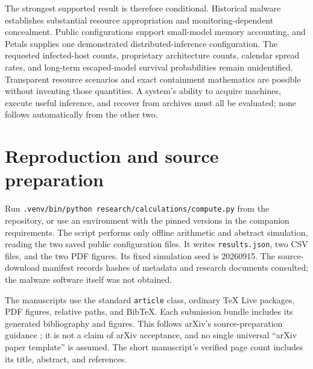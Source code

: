 \documentclass[11pt]{article}
\begin{document}
The strongest supported result is therefore conditional. Historical malware establishes substantial resource appropriation and monitoring-dependent concealment. Public configurations support small-model memory accounting, and Petals supplies one demonstrated distributed-inference configuration. The requested infected-host counts, proprietary architecture counts, calendar spread rates, and long-term escaped-model survival probabilities remain unidentified. Transparent resource scenarios and exact containment mathematics are possible without inventing those quantities. A system's ability to acquire machines, execute useful inference, and recover from archives must all be evaluated; none follows automatically from the other two.

\appendix
\section{Reproduction and source preparation}
Run \texttt{.venv/bin/python research/calculations/compute.py} from the repository, or use an environment with the pinned versions in the companion requirements. The script performs only offline arithmetic and abstract simulation, reading the two saved public configuration files. It writes \texttt{results.json}, two CSV files, and the two PDF figures. Its fixed simulation seed is 20260915. The source-download manifest records hashes of metadata and research documents consulted; the malware software itself was not obtained.

The manuscripts use the standard \texttt{article} class, ordinary TeX Live packages, PDF figures, relative paths, and BibTeX. Each submission bundle includes its generated bibliography and figures. This follows arXiv's source-preparation guidance \citep{arxivguide}; it is not a claim of arXiv acceptance, and no single universal ``arXiv paper template'' is assumed. The short manuscript's verified page count includes its title, abstract, and references.


{\small\raggedright\setlength{\bibsep}{4pt}}
\end{document}
